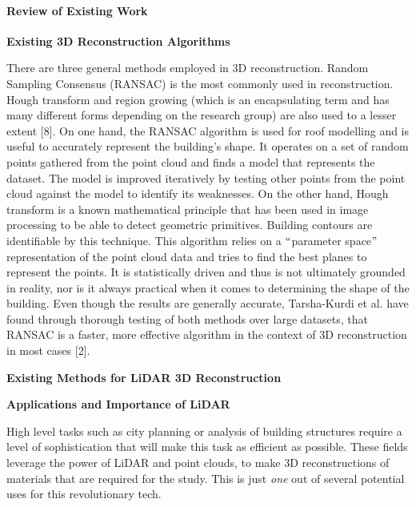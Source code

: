 \documentclass[12pt]{report}
\begin{document}
\vspace{\baselineskip}
\paragraph*{Review of Existing Work}

\vspace{\baselineskip}
\textbf{Existing 3D Reconstruction Algorithms\tab }\par


\vspace{\baselineskip}
There are three general methods employed in 3D reconstruction. Random Sampling Consensus (RANSAC) is the most commonly used in reconstruction. Hough transform and region growing (which is an encapsulating term and has many different forms depending on the research group) are also used to a lesser extent [8]. On one hand, the RANSAC algorithm is used for roof modelling and is useful to accurately represent the building’s shape. It operates on a set of random points gathered from the point cloud and finds a model that represents the dataset. The model is improved iteratively by testing other points from the point cloud against the model to identify its weaknesses. On the other hand, Hough transform is a known mathematical principle that has been used in image processing to be able to detect geometric primitives. Building contours are identifiable by this technique. This algorithm relies on a $``$parameter space$"$  representation of the point cloud data and tries to find the best planes to represent the points. It is statistically driven and thus is not ultimately grounded in reality, nor is it always practical when it comes to determining the shape of the building. Even though the results are generally accurate, Tarsha-Kurdi et al. have found through thorough testing of both methods over large datasets, that RANSAC is a faster, more effective algorithm in the context of 3D reconstruction in most cases [2].\tab \par


\vspace{\baselineskip}
\textbf{Existing Methods for LiDAR 3D Reconstruction}\par


\vspace{\baselineskip}
\textbf{Applications and Importance of LiDAR}\par


\vspace{\baselineskip}
High level tasks such as city planning or analysis of building structures require a level of sophistication that will make this task as efficient as possible. These fields leverage the power of LiDAR and point clouds, to make 3D reconstructions of materials that are required for the study. This is just \textit{one} out of several potential uses for this revolutionary tech.\par
\end{document}

